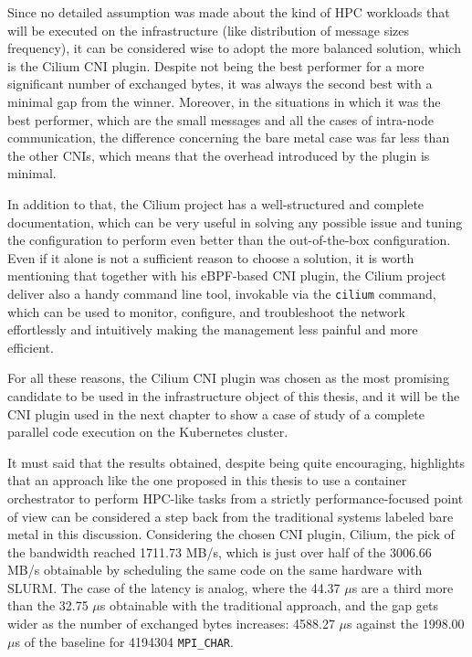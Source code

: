 Since no detailed assumption was made about the kind of HPC workloads that will
be executed on the infrastructure (like distribution of message sizes
frequency), it can be considered wise to adopt the more balanced solution, which
is the Cilium CNI plugin.
Despite not being the best performer for a more significant number of exchanged
bytes, it was always the second best with a minimal gap from the winner.
Moreover, in the situations in which it was the best performer, which are the
small messages and all the cases of intra-node communication, the difference
concerning the bare metal case was far less than the other CNIs, which means
that the overhead introduced by the plugin is minimal.

In addition to that, the Cilium project has a well-structured and complete
documentation, which can be very useful in solving any possible issue and tuning
the configuration to perform even better than the out-of-the-box configuration.
Even if it alone is not a sufficient reason to choose a solution, it is worth
mentioning that together with his eBPF-based CNI plugin, the Cilium project
deliver also a handy command line tool, invokable via the \texttt{cilium}
command, which can be used to monitor, configure, and troubleshoot the network
effortlessly and intuitively making the management less painful and more
efficient.

For all these reasons, the Cilium CNI plugin was chosen as the most promising
candidate to be used in the infrastructure object of this thesis, and it will be
the CNI plugin used in the next chapter to show a case of study of a complete
parallel code execution on the Kubernetes cluster.

It must said that the results obtained, despite being quite encouraging,
highlights that an approach like the one proposed in this thesis to use a
container orchestrator to perform HPC-like tasks from a strictly
performance-focused point of view can be considered a step back from the
traditional systems labeled bare metal in this discussion.
Considering the chosen CNI plugin, Cilium, the pick of the bandwidth reached
1711.73 MB/s, which is just over half of the 3006.66 MB/s obtainable by
scheduling the same code on the same hardware with SLURM.
The case of the latency is analog, where the 44.37 $\mu$s are a third more than
the 32.75 $\mu$s obtainable with the traditional approach, and the gap gets
wider as the number of exchanged bytes increases: 4588.27 $\mu$s against the
1998.00 $\mu$s of the baseline for 4194304 \texttt{MPI\_CHAR}.

